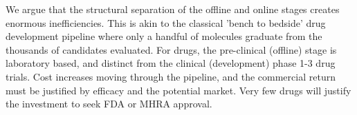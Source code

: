 \documentclass[pmlr,twocolumn,10pt]{jmlr} %
\newtheorem*{note}{Note}
\begin{document}



We argue that the structural separation of the offline and online stages creates enormous inefficiencies.\citep{vaitla2020a} This is akin to the classical 'bench to bedside' drug development pipeline where only a handful of molecules graduate from the thousands of candidates evaluated. For drugs, the pre-clinical (offline) stage is laboratory based, and distinct from the clinical (development) phase 1-3 drug trials. Cost increases moving through the pipeline, and the commercial return must be justified by efficacy and the potential market. Very few drugs will justify the investment to seek FDA or MHRA approval. 
\end{document}
